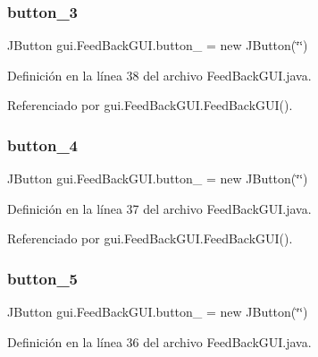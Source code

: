 \subsubsection{\texorpdfstring{button\_3}{button\_3}}
{\footnotesize\ttfamily J\+Button gui.\+Feed\+Back\+G\+U\+I.\+button\+\_ = new J\+Button(\char`\"{}\char`\"{})\hspace{0.3cm}{\ttfamily [private]}}



Definición en la línea 38 del archivo Feed\+Back\+G\+U\+I.\+java.



Referenciado por gui.\+Feed\+Back\+G\+U\+I.\+Feed\+Back\+G\+U\+I().

\mbox{\label{classgui_1_1_feed_back_g_u_i_a260750f04cc70576dee71a3d2d321559}} 
\subsubsection{\texorpdfstring{button\_4}{button\_4}}
{\footnotesize\ttfamily J\+Button gui.\+Feed\+Back\+G\+U\+I.\+button\+\_ = new J\+Button(\char`\"{}\char`\"{})\hspace{0.3cm}{\ttfamily [private]}}



Definición en la línea 37 del archivo Feed\+Back\+G\+U\+I.\+java.



Referenciado por gui.\+Feed\+Back\+G\+U\+I.\+Feed\+Back\+G\+U\+I().

\mbox{\label{classgui_1_1_feed_back_g_u_i_aa98ecf04e9e2c9a78988ad724dcc452f}} 
\subsubsection{\texorpdfstring{button\_5}{button\_5}}
{\footnotesize\ttfamily J\+Button gui.\+Feed\+Back\+G\+U\+I.\+button\+\_ = new J\+Button(\char`\"{}\char`\"{})\hspace{0.3cm}{\ttfamily [private]}}



Definición en la línea 36 del archivo Feed\+Back\+G\+U\+I.\+java.



